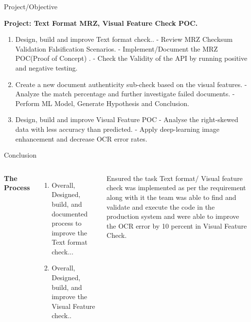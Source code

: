 \documentclass[aspectratio=169,xcolor=dvipsnames]{beamer}
\begin{document}
\begin{frame}{Project/Objective }
    \tableofcontents

    \textbf{Project: Text Format MRZ, Visual Feature Check POC.}
    \begin{enumerate}
        \item Design, build and improve Text format check..\break 
            - Review MRZ Checksum Validation Falsification Scenarios.\break 
            - Implement/Document the MRZ POC(Proof of Concept)  .\break
            - Check the Validity of the API by running positive and negative testing. \break
            
         \item  Create a new document authenticity sub-check based on the visual features.\break 
            - Analyze the match percentage and further investigate failed documents.\break 
            - Perform ML Model, Generate Hypothesis and Conclusion.\break
            
        \item Design, build and improve Visual Feature POC\break 
            - Analyse the right-skewed data with less accuracy than predicted.\break 
            - Apply deep-learning image enhancement and decrease OCR error rates.\break
        \end{enumerate}
\end{frame}

\begin{frame}{Conclusion}
    \tableofcontents

    \begin{columns}[c] %

        \textbf{The Process}
        \begin{enumerate}
            \item Overall, Designed, build, and documented process to improve the Text format check...
            \item Overall, Designed, build, and improve the Visual Feature check.. 
        \end{enumerate}

         Ensured the task Text format/ Visual feature check was implemented as per the requirement along with it the team was able to find and validate and execute the code in the production system and were able to improve the OCR error by 10 percent in Visual Feature Check.

    \end{columns}   \\

\end{frame}
\end{document}
